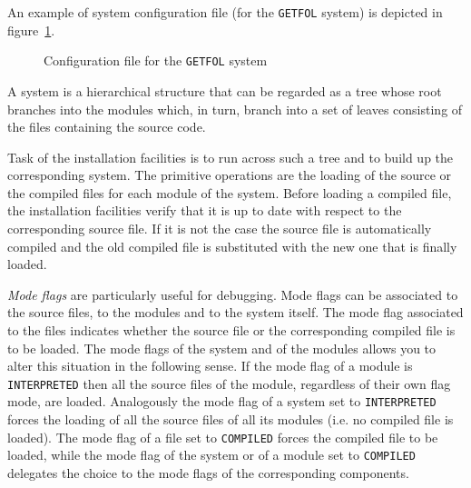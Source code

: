An example of system configuration file (for the {\tt GETFOL} system)
is depicted in figure~\ref{syscfg}.

\begin{figure}
 
 \caption{Configuration file for the {\tt GETFOL} system}
 \label{syscfg}
\end{figure}

A system is a hierarchical structure that can be regarded as a tree
whose root branches into the modules which, in turn, branch into a set
of leaves consisting of the files containing the source code.

Task of the installation facilities is to run across such a tree and to
build up the corresponding system.
The primitive operations are the loading of the source or the compiled files
for each module of the system.
Before loading a compiled file, the installation facilities verify that
it is up to date with respect to the corresponding source file.
If it is not the case the source file is automatically compiled and the old
compiled file is substituted with the new one that is finally loaded.

{\it Mode flags} are particularly useful for debugging.
Mode flags can be associated to the source files,
to the modules and to the system itself.
The mode flag associated to the files indicates whether the source file
or the corresponding compiled file is to be loaded.
The mode flags of the system and of the modules allows you to alter this
situation in the following sense.
If the mode flag of a module is {\tt INTERPRETED} then all the source files
of the module, regardless of their own flag mode, are loaded.
Analogously the mode flag of a system set to {\tt INTERPRETED} forces the
loading of all the source files of all its modules (i.e. no compiled file
is loaded).
The mode flag of a file set to {\tt COMPILED} forces the compiled file
to be loaded, while the mode flag of the system or of a module set to
{\tt COMPILED} delegates the choice to the mode flags of the corresponding 
components.
